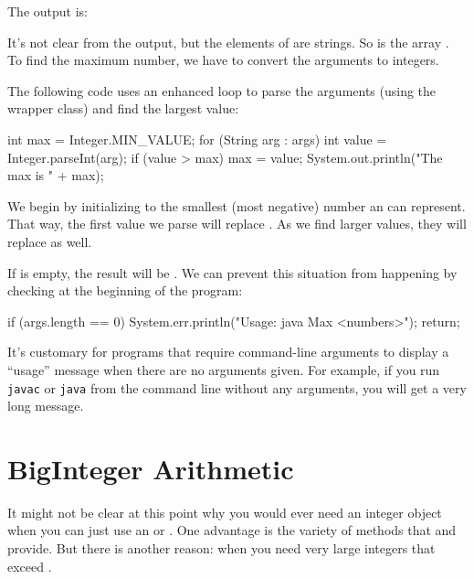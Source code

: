 The output is:

\begin{stdout}
[10, -3, 55, 0, 14]
\end{stdout}

It's not clear from the output, but the elements of  are strings.
So  is the array .
To find the maximum number, we have to convert the arguments to integers.

The following code uses an enhanced  loop to parse the arguments (using the  wrapper class) and find the largest value:

\begin{code}
int max = Integer.MIN_VALUE;
for (String arg : args) {
    int value = Integer.parseInt(arg);
    if (value > max) {
        max = value;
    }
}
System.out.println("The max is " + max);
\end{code}

We begin by initializing  to the smallest (most negative) number an  can represent.
That way, the first value we parse will replace .
As we find larger values, they will replace  as well.

If  is empty, the result will be .
We can prevent this situation from happening by checking  at the beginning of the program:

\begin{code}
if (args.length == 0) {
    System.err.println("Usage: java Max <numbers>");
    return;
}
\end{code}

It's customary for programs that require command-line arguments to display a ``usage'' message when there are no arguments given.
For example, if you run {\tt javac} or {\tt java} from the command line without any arguments, you will get a very long message.


\section{BigInteger Arithmetic}

It might not be clear at this point why you would ever need an integer object when you can just use an  or .
One advantage is the variety of methods that  and  provide.
But there is another reason: when you need very large integers that exceed .


